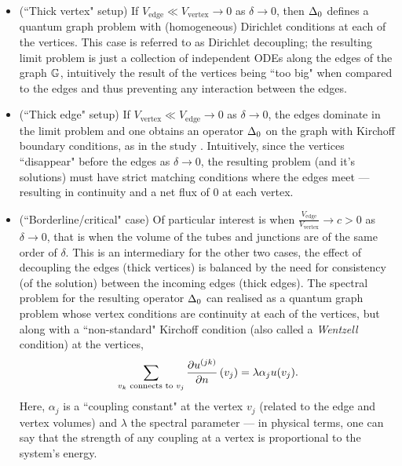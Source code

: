 \begin{itemize}
	\item (``Thick vertex" setup) If $V_{\mathrm{edge}}\ll V_{\mathrm{vertex}}\rightarrow0$ as $\delta\rightarrow0$, then $\Delta_0$ defines a quantum graph problem with (homogeneous) Dirichlet conditions at each of the vertices.
	This case is referred to as Dirichlet decoupling; the resulting limit problem is just a collection of independent ODEs along the edges of the graph $\mathbb{G}$, intuitively the result of the vertices being ``too big" when compared to the edges and thus preventing any interaction between the edges.
	\item (``Thick edge" setup) If $V_{\mathrm{vertex}}\ll V_{\mathrm{edge}}\rightarrow0$ as $\delta\rightarrow0$, the edges dominate in the limit problem and one obtains an operator $\Delta_0$ on the graph with Kirchoff boundary conditions, as in the study \cite{kuchment2001convergence}.
	Intuitively, since the vertices ``disappear" before the edges as $\delta\rightarrow0$, the resulting problem (and it's solutions) must have strict matching conditions where the edges meet --- resulting in continuity and a net flux of 0 at each vertex.
	\item (``Borderline/critical" case) Of particular interest is when $\frac{V_{\mathrm{edge}}}{V_{\mathrm{vertex}}}\rightarrow c>0$ as $\delta\rightarrow0$, that is when the volume of the tubes and junctions are of the same order of $\delta$.
	This is an intermediary for the other two cases, the effect of decoupling the edges (thick vertices) is balanced by the need for consistency (of the solution) between the incoming edges (thick edges).
	The spectral problem for the resulting operator $\Delta_0$ can realised as a quantum graph problem whose vertex conditions are continuity at each of the vertices, but along with a ``non-standard" Kirchoff condition (also called a \emph{Wentzell} condition) at the vertices,
	\begin{align*}
	\sum_{v_k \text{ connects to } v_j} 
	\dfrac{\partial u^{(jk)}}{\partial n}\left( v_j \right) = \lambda\alpha_j u(v_j).
	\end{align*}
	Here, $\alpha_j$ is a ``coupling constant" at the vertex $v_j$ (related to the edge and vertex volumes) and $\lambda$ the spectral parameter --- in physical terms, one can say that the strength of any coupling at a vertex is proportional to the system's energy.
\end{itemize}

